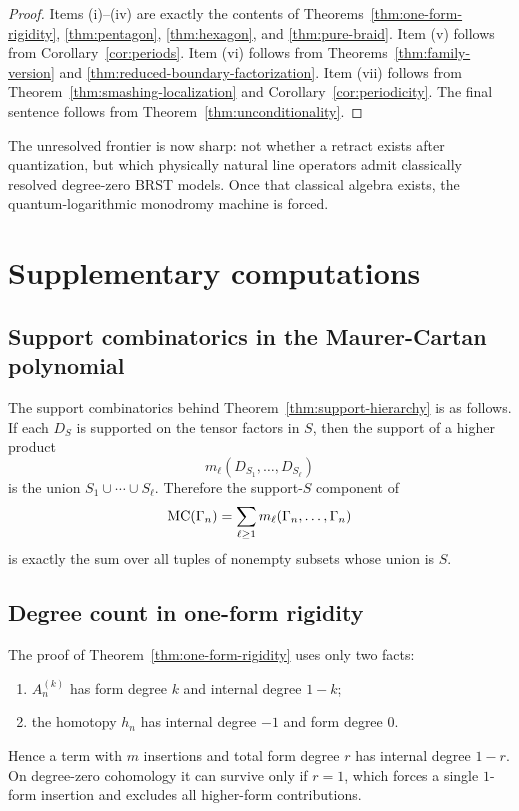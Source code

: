 \begin{proof}
Items (i)--(iv) are exactly the contents of Theorems~\ref{thm:one-form-rigidity}, \ref{thm:pentagon}, \ref{thm:hexagon}, and \ref{thm:pure-braid}. Item (v) follows from Corollary~\ref{cor:periods}. Item (vi) follows from Theorems~\ref{thm:family-version} and \ref{thm:reduced-boundary-factorization}. Item (vii) follows from Theorem~\ref{thm:smashing-localization} and Corollary~\ref{cor:periodicity}. The final sentence follows from Theorem~\ref{thm:unconditionality}.
\end{proof}

\begin{remark}
The unresolved frontier is now sharp: not whether a retract exists after quantization, but which physically natural line operators admit classically resolved degree-zero BRST models. Once that classical algebra exists, the quantum-logarithmic monodromy machine is forced.
\end{remark}

\section{Supplementary computations}

\subsection{Support combinatorics in the Maurer-Cartan polynomial}
The support combinatorics behind Theorem~\ref{thm:support-hierarchy} is as follows. If each $D_S$ is supported on the tensor factors in $S$, then the support of a higher product
\[
 m_\ell(D_{S_1},\dots,D_{S_\ell})
\]
is the union $S_1\cup\cdots\cup S_\ell$. Therefore the support-$S$ component of
\[
 \mathrm{MC}(\Gamma_n)=\sum_{\ell\ge 1}m_\ell(\Gamma_n,\dots,\Gamma_n)
\]
is exactly the sum over all tuples of nonempty subsets whose union is $S$.

\subsection{Degree count in one-form rigidity}
The proof of Theorem~\ref{thm:one-form-rigidity} uses only two facts:
\begin{enumerate}[label=\textup{(\alph*)}]
 \item $A_n^{(k)}$ has form degree $k$ and internal degree $1-k$;
 \item the homotopy $h_n$ has internal degree $-1$ and form degree $0$.
\end{enumerate}
Hence a term with $m$ insertions and total form degree $r$ has internal degree $1-r$. On degree-zero cohomology it can survive only if $r=1$, which forces a single $1$-form insertion and excludes all higher-form contributions.

